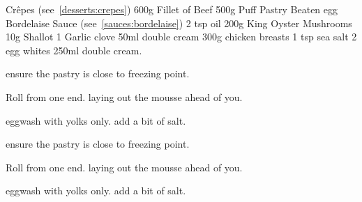 
\begin{ingreds}
	Cr\^epes (see~\ref{desserts:crepes})
	600g Fillet of Beef
	500g Puff Pastry
	Beaten egg
	Bordelaise Sauce (see~\ref{sauces:bordelaise})
	2 tsp oil
	200g King Oyster Mushrooms
	10g Shallot
	1 Garlic clove
	50ml double cream
	300g chicken breasts
	1 tsp sea salt
	2 egg whites
	250ml double cream.
\end{ingreds}

\begin{method}
	ensure the pastry is close to freezing point.

	Roll from one end. laying out the mousse ahead of you.

	eggwash with yolks only.  add a bit of salt.

\end{method}ensure the pastry is close to freezing point.

Roll from one end. laying out the mousse ahead of you.

eggwash with yolks only.  add a bit of salt.
